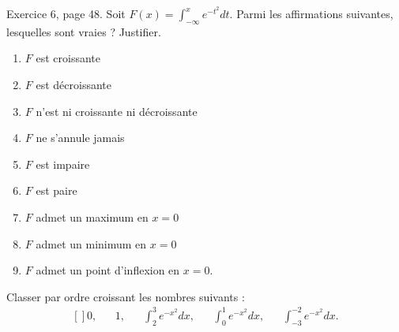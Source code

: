 \begin{exercice}\label{exo0021}

Exercice 6, page 48. Soit $F(x)=\int_{-\infty}^xe^{-t^2}dt$. Parmi les affirmations suivantes, lesquelles sont vraies ? Justifier.

\begin{multicols}{2}
\begin{enumerate}

\item
$F$ est croissante
\item
$F$ est décroissante

\item
$F$ n'est ni croissante ni décroissante

\item
$F$ ne s'annule jamais

\item
$F$ est impaire

\item
$F$ est paire

\item
$F$ admet un maximum en $x=0$

\item
$F$ admet un minimum en $x=0$

\item
$F$ admet un point d'inflexion en $x=0$.

\end{enumerate}
\end{multicols}

Classer par ordre croissant les nombres suivants :
\begin{equation}
	\begin{aligned}[]
		0,&&1,&&\int_2^3 e^{-x^2}dx,&&\int_0^1 e^{-x^2}dx,&&\int_{-3}^{-2} e^{-x^2}dx.
	\end{aligned}
\end{equation}

\end{exercice}
